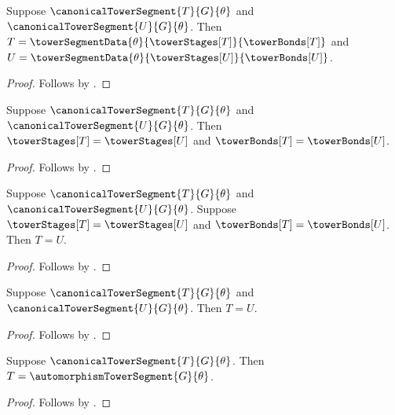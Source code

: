 \begin{proposition}\label{canonical_tower_constructor_identities}
    Suppose $\canonicalTowerSegment{T}{G}{\theta}$ and
        $\canonicalTowerSegment{U}{G}{\theta}$.
    Then $T=\towerSegmentData{\theta}
            {\towerStages[T]}{\towerBonds[T]}$ and
        $U=\towerSegmentData{\theta}
            {\towerStages[U]}{\towerBonds[U]}$.
\end{proposition}
\begin{proof}
    Follows by .
\end{proof}

\begin{proposition}\label{canonical_tower_fields_equal}
    Suppose $\canonicalTowerSegment{T}{G}{\theta}$ and
        $\canonicalTowerSegment{U}{G}{\theta}$.
    Then $\towerStages[T]=\towerStages[U]$ and
        $\towerBonds[T]=\towerBonds[U]$.
\end{proposition}
\begin{proof}
    Follows by
        .
\end{proof}

\begin{proposition}\label{canonical_tower_segment_equality_from_fields}
    Suppose $\canonicalTowerSegment{T}{G}{\theta}$ and
        $\canonicalTowerSegment{U}{G}{\theta}$.
    Suppose $\towerStages[T]=\towerStages[U]$ and
        $\towerBonds[T]=\towerBonds[U]$.
    Then $T=U$.
\end{proposition}
\begin{proof}
    Follows by
        .
\end{proof}

\begin{theorem}\label{canonical_tower_segment_unique}
    Suppose $\canonicalTowerSegment{T}{G}{\theta}$ and
        $\canonicalTowerSegment{U}{G}{\theta}$.
    Then $T=U$.
\end{theorem}
\begin{proof}
    Follows by
        .
\end{proof}

\begin{corollary}\label{canonical_tower_segment_eq_constructed_segment}
    Suppose $\canonicalTowerSegment{T}{G}{\theta}$.
    Then $T=\automorphismTowerSegment{G}{\theta}$.
\end{corollary}
\begin{proof}
    Follows by
        .
\end{proof}
